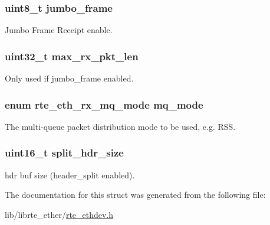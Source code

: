 \subsubsection[{jumbo\+\_\+frame}]{\setlength{\rightskip}{0pt plus 5cm}uint8\+\_\+t jumbo\+\_\+frame}\label{structrte__eth__rxmode_a372e758c4721d73336631cc1e592ca23}
Jumbo Frame Receipt enable. \hypertarget{structrte__eth__rxmode_a84a5d32306b86a1df884144612c70726}{}
\subsubsection[{max\+\_\+rx\+\_\+pkt\+\_\+len}]{\setlength{\rightskip}{0pt plus 5cm}uint32\+\_\+t max\+\_\+rx\+\_\+pkt\+\_\+len}\label{structrte__eth__rxmode_a84a5d32306b86a1df884144612c70726}
Only used if jumbo\+\_\+frame enabled. \hypertarget{structrte__eth__rxmode_aa0562513c4569f1aa53050f1beac6b5d}{}
\subsubsection[{mq\+\_\+mode}]{\setlength{\rightskip}{0pt plus 5cm}enum {\bf rte\+\_\+eth\+\_\+rx\+\_\+mq\+\_\+mode} mq\+\_\+mode}\label{structrte__eth__rxmode_aa0562513c4569f1aa53050f1beac6b5d}
The multi-\/queue packet distribution mode to be used, e.\+g. R\+S\+S. \hypertarget{structrte__eth__rxmode_a7aa0d86e260af96607d007c7361ab21e}{}
\subsubsection[{split\+\_\+hdr\+\_\+size}]{\setlength{\rightskip}{0pt plus 5cm}uint16\+\_\+t split\+\_\+hdr\+\_\+size}\label{structrte__eth__rxmode_a7aa0d86e260af96607d007c7361ab21e}
hdr buf size (header\+\_\+split enabled). 

The documentation for this struct was generated from the following file\+:\begin{DoxyCompactItemize}
\item 
lib/librte\+\_\+ether/\hyperlink{rte__ethdev_8h}{rte\+\_\+ethdev.\+h}\end{DoxyCompactItemize}
